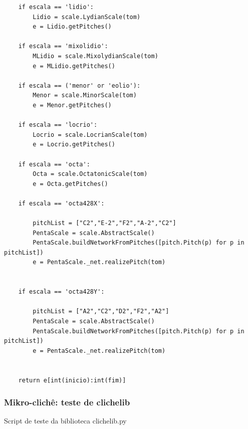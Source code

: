 \documentclass[
	12pt,				%
	openright,			%
	twoside,			%
	a4paper,			%
	english,			%
	french,				%
	spanish,			%
	brazil				%
	]{abntex2}
\begin{document}
\begin{lstlisting}
	if escala == 'lidio':
		Lidio = scale.LydianScale(tom)
		e = Lidio.getPitches()

	if escala == 'mixolidio':
		MLidio = scale.MixolydianScale(tom)
		e = MLidio.getPitches()

	if escala == ('menor' or 'eolio'):
		Menor = scale.MinorScale(tom)
		e = Menor.getPitches()

	if escala == 'locrio':
		Locrio = scale.LocrianScale(tom)
		e = Locrio.getPitches()

	if escala == 'octa':
		Octa = scale.OctatonicScale(tom)
		e = Octa.getPitches()

	if escala == 'octa428X':

		pitchList = ["C2","E-2","F2","A-2","C2"]
		PentaScale = scale.AbstractScale()
		PentaScale.buildNetworkFromPitches([pitch.Pitch(p) for p in pitchList])
		e = PentaScale._net.realizePitch(tom)


	if escala == 'octa428Y':

		pitchList = ["A2","C2","D2","F2","A2"]
		PentaScale = scale.AbstractScale()
		PentaScale.buildNetworkFromPitches([pitch.Pitch(p) for p in pitchList])
		e = PentaScale._net.realizePitch(tom)


	return e[int(inicio):int(fim)]

\end{lstlisting}

\subsubsection{Mikro-clichê: teste de clichelib}

Script de teste da biblioteca clichelib.py
\end{document}
